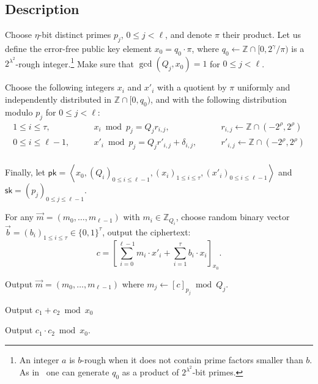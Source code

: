 \documentclass[11pt]{llncs}
\renewcommand\leq\leqslant
\newcommand{\Z}{{\mathbb Z}}
\DeclareMathOperator{\KeyGen}{\ensuremath{\mathsf{KeyGen}}}
\DeclareMathOperator{\Encrypt}{\ensuremath{\mathsf{Encrypt}}}
\DeclareMathOperator{\Decrypt}{\ensuremath{\mathsf{Decrypt}}}
\DeclareMathOperator{\Add}{\ensuremath{\mathsf{Add}}}
\DeclareMathOperator{\Mult}{\ensuremath{\mathsf{Mult}}}
\newcommand*{\pk}{\ensuremath{\mathsf{pk}}}
\newcommand*{\sk}{\ensuremath{\mathsf{sk}}}
\newcommand*{\CDGHV}{\ensuremath{\mathsf{IDGHV}}}
\begin{document}
\subsection{Description}
\begin{description}\label{CDGHV}
\item[$\CDGHV.\KeyGen(1^\lambda,(Q_j)_{0\leq j <\ell})$.] Choose $\eta$-bit distinct primes $p_j$, $0\leq j<\ell$, and denote $\pi$
their product. Let us define the error-free public key element
$x_0=q_0\cdot\pi$, where $q_0 \gets \Z \cap [0,2^{\gamma}/\pi)$
  is a $2^{\lambda^2}$-rough integer.\footnote{An integer $a$ is $b$-rough when it does
    not contain prime factors smaller than $b$. As in~\cite{CMNT2011} one can
    generate $q_0$ as a product of $2^{\lambda^2}$-bit primes.}  
  Make sure that $\gcd(Q_j,x_0)=1$ for $0\leq j<\ell$. 
  
  Choose the following integers $x_i$ and $x'_i$ with a quotient by $\pi$ uniformly
  and independently distributed in $\Z\cap [0, q_0)$, and with the
    following distribution modulo $p_j$ for $0 \leq j < \ell$:
$$
\begin{array}{lll}
1 \leq i \leq \tau, & \qquad x_i\bmod p_j = Q_j r_{i,j},& \qquad r_{i,j}
\gets\Z\cap(-2^{\rho}, 2^{\rho}) \\[.2cm]

0\leq i\leq \ell-1, & \qquad x'_i\bmod p_j = Q_jr'_{i,j}+\delta_{i,j}, &
\qquad r'_{i,j}\gets\Z\cap(-2^{\rho}, 2^{\rho}) \\[.2cm]

\end{array}
$$

Finally, let $\pk = \left\langle x_0, \left(Q_i\right)_{0\leq i \leq \ell-1},\left(x_i\right)_{1\leq i\leq \tau}, \left(x'_i\right)_{0\leq i\leq \ell-1}\right\rangle$ and $\sk=(p_j)_{0\leq j\leq {\ell-1}}$.
\\\vspace{-0.25cm}
\item[$\CDGHV.\Encrypt(\pk, {\vec{m}})$.] For any $\vec{m}=(m_0,\dots,m_{\ell-1})$ with $m_i\in\Z_{Q_i}$, choose random binary vector $\vec{b}=(b_i)_{1\leq i \leq \tau}\in \{0,1\}^\tau$, output the ciphertext:
\begin{equation}
\label{eq:enccdghv}
c = \left[\sum\limits_{i=0}^{\ell-1} m_i \cdot x'_i + 
	\sum_{i=1}^\tau 
b_i\cdot x_i\right]_{x_0}.
\end{equation}
\item[$\CDGHV.\Decrypt(\sk, c)$.] Output $\vec{m}=(m_0,\ldots,m_{\ell-1})$ where $m_j \gets [c]_{p_j} \bmod Q_j$.
\\\vspace{-0.25cm}
\item[$\CDGHV.\Add(\pk, c_1, c_2)$.] Output $c_1+c_2 \bmod x_0$
\\\vspace{-0.25cm}
\item[$\CDGHV.\Mult(\pk, c_1, c_2)$.] Output $c_1 \cdot c_2 \bmod x_0$.
\end{description}
\end{document}
